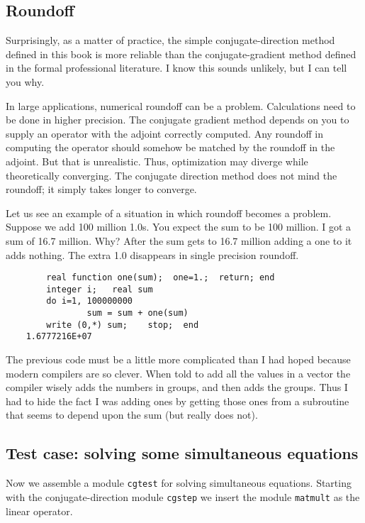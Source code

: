 \subsection{Roundoff}

Surprisingly, as a matter of practice, the simple conjugate-direction method
defined in this book is more reliable than the conjugate-gradient method
defined in the formal professional literature.
I know this sounds unlikely, but I can tell you why.
\par
In large applications, 
numerical roundoff can be a problem. 
Calculations need to be done in higher precision.
The conjugate gradient method depends on you to supply an operator
with the adjoint correctly computed.
Any roundoff in computing the operator should somehow be matched
by the roundoff in the adjoint.   But that is unrealistic.
Thus, optimization may diverge while theoretically converging.
The conjugate direction method does not mind the roundoff;
it simply takes longer to converge.
\par
Let us see an example of a situation in which roundoff becomes a problem.
Suppose we add 100 million 1.0s.  You expect the sum to be 100 million.
I got a sum of 16.7 million.
Why?
After the sum gets to 16.7 million adding a one to it adds nothing.
The extra 1.0 disappears in single precision roundoff.
\par
\begin{verbatim}
        real function one(sum);  one=1.;  return; end
        integer i;   real sum
        do i=1, 100000000
                sum = sum + one(sum)
        write (0,*) sum;    stop;  end
	1.6777216E+07
\end{verbatim}
\par
The previous code must be a little more complicated than I had hoped
because modern compilers are so clever.
When told to add all the values in a vector the compiler wisely
adds the numbers in groups, and then adds the groups.
Thus I had to hide the fact I was adding ones by getting those ones
from a subroutine that seems to depend upon the sum (but really
does not).

\subsection{Test case: solving some simultaneous equations}
\par
Now we assemble a module \texttt{cgtest} for solving simultaneous equations.
Starting with the conjugate-direction module {\tt cgstep} 
we insert the module \texttt{matmult}  as the linear operator.

